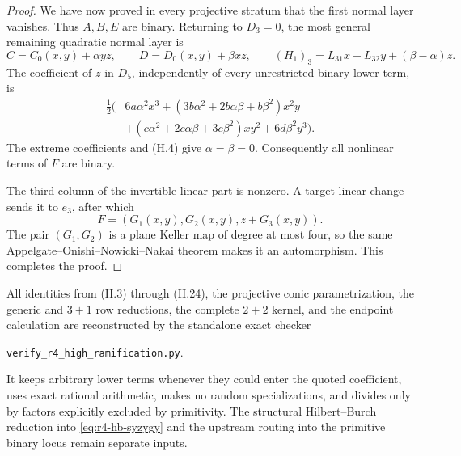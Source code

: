 \begin{proof}
We have now proved in every projective stratum that the first normal layer
vanishes.  Thus \(A,B,E\) are binary.  Returning to \(D_3=0\), the most
general remaining quadratic normal layer is
\[
 C=C_0(x,y)+\alpha yz,
 \qquad
 D=D_0(x,y)+\beta xz,
 \qquad
 (H_1)_3=L_{31}x+L_{32}y+(\beta-\alpha)z.
\]
The coefficient of \(z\) in \(D_5\), independently of every unrestricted
binary lower term, is
\begin{equation}
\begin{aligned}
\frac12\bigl(&6a\alpha^2x^3
 +(3b\alpha^2+2b\alpha\beta+b\beta^2)x^2y\\
&+(c\alpha^2+2c\alpha\beta+3c\beta^2)xy^2
 +6d\beta^2y^3\bigr).
\end{aligned}
\tag{H.24}
\end{equation}
The extreme coefficients and (H.4) give \(\alpha=\beta=0\).
Consequently all nonlinear terms of \(F\) are binary.

The third column of the invertible linear part is nonzero.  A target-linear
change sends it to \(e_3\), after which
\[
 F=(G_1(x,y),G_2(x,y),z+G_3(x,y)).
\]
The pair \((G_1,G_2)\) is a plane Keller map of degree at most four, so the
same Appelgate--Onishi--Nowicki--Nakai theorem makes it an automorphism.
This completes the proof.
\end{proof}

\begin{remark}
All identities from (H.3) through (H.24), the projective conic
parametrization, the generic and \(3+1\) row reductions, the complete
\(2+2\) kernel, and the endpoint calculation are reconstructed by the
standalone exact checker
\begin{center}
\texttt{verify\_r4\_high\_ramification.py}.
\end{center}
It keeps arbitrary lower terms whenever they could enter the quoted
coefficient, uses exact rational arithmetic, makes no random
specializations, and divides only by factors explicitly excluded by
primitivity.  The structural Hilbert--Burch reduction into
\eqref{eq:r4-hb-syzygy} and the upstream routing into the primitive binary
locus remain separate inputs.
\end{remark}
